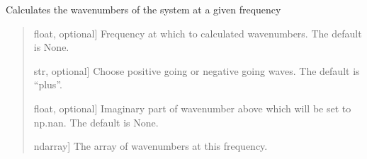 \documentclass[letterpaper,10pt,english]{sphinxmanual}
\begin{document}
\begin{fulllineitems}
\begin{fulllineitems}
\begin{quote}
\begin{description}
\begin{description}
\begin{description}
\begin{itemize}
\end{itemize}

\end{description}

\end{description}

\end{description}\end{quote}

\end{fulllineitems}


\begin{fulllineitems}
\label{\detokenize{model:pywfe.Model.wavenumbers}}
\pysigstartsignatures
{}
\pysigstopsignatures
\sphinxAtStartPar
Calculates the wavenumbers of the system at a given frequency
\begin{quote}\begin{description}
\begin{description}
\sphinxlineitem{\sphinxstylestrong{f}}{[}float, optional{]}
\sphinxAtStartPar
Frequency at which to calculated wavenumbers. The default is None.

\sphinxlineitem{\sphinxstylestrong{direction}}{[}str, optional{]}
\sphinxAtStartPar
Choose positive going or negative going waves. The default is “plus”.

\sphinxlineitem{\sphinxstylestrong{imag\_threshold}}{[}float, optional{]}
\sphinxAtStartPar
Imaginary part of wavenumber above which will be set to np.nan.
The default is None.

\end{description}

\begin{description}
\sphinxlineitem{\sphinxstylestrong{k}}{[}ndarray{]}
\sphinxAtStartPar
The array of wavenumbers at this frequency.

\end{description}

\end{description}\end{quote}


\end{fulllineitems}
\end{fulllineitems}
\end{document}

